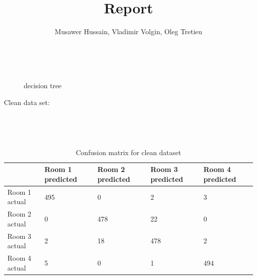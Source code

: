 \documentclass{article}
\begin{document}
\title{Report}

\author{Musawer Hussain, Vladimir Volgin, Oleg Tretieu}

\maketitle

\

\begin{figure}[h]
  \caption{decision tree}
\end{figure}
\pagebreak 

\begin{center}
Clean data set:
\end{center}
  \\

\begin{table}[htb]
  \caption{Confusion matrix for clean dataset} \\
  \begin{tabular}{|l|l|l|l|l|}
  \hline
                & Room 1 predicted & Room 2 predicted & Room 3 predicted & Room 4 predicted \\ \hline
  Room 1 actual & 495              & 0                & 2                & 3                \\ \hline
  Room 2 actual & 0                & 478              & 22               & 0                \\ \hline
  Room 3 actual & 2                & 18               & 478              & 2                \\ \hline
  Room 4 actual & 5                & 0                & 1                & 494              \\ \hline
  \end{tabular}
\end{table}
\end{document}
